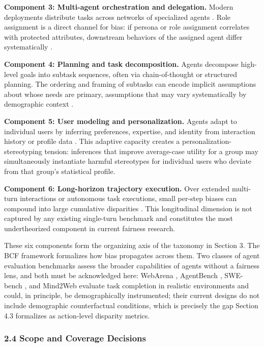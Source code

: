 \documentclass[10pt]{article}
\begin{document}
\textbf{Component 3: Multi-agent orchestration and delegation.} Modern deployments distribute tasks across networks of specialized agents \cite{wu2023autogen,park2023generative}. Role assignment is a direct channel for bias: if persona or role assignment correlates with protected attributes, downstream behaviors of the assigned agent differ systematically \cite{gupta2023bias,nguyen2025social}.

\textbf{Component 4: Planning and task decomposition.} Agents decompose high-level goals into subtask sequences, often via chain-of-thought or structured planning. The ordering and framing of subtasks can encode implicit assumptions about whose needs are primary, assumptions that may vary systematically by demographic context \cite{li2025actions,wu2025reasoning}.

\textbf{Component 5: User modeling and personalization.} Agents adapt to individual users by inferring preferences, expertise, and identity from interaction history or profile data \cite{kantharuban2024stereotype}. This adaptive capacity creates a personalization-stereotyping tension: inferences that improve average-case utility for a group may simultaneously instantiate harmful stereotypes for individual users who deviate from that group's statistical profile.

\textbf{Component 6: Long-horizon trajectory execution.} Over extended multi-turn interactions or autonomous task executions, small per-step biases can compound into large cumulative disparities \cite{ma2026implicit,wyllie2024fairness}. This longitudinal dimension is not captured by any existing single-turn benchmark and constitutes the most undertheorized component in current fairness research.

These six components form the organizing axis of the taxonomy in Section 3. The BCF framework formalizes how bias propagates across them. Two classes of agent evaluation benchmarks assess the broader capabilities of agents without a fairness lens, and both must be acknowledged here: WebArena \cite{zhou2024webarena}, AgentBench \cite{liu2024agentbench}, SWE-bench \cite{jimenez2024swe}, and Mind2Web \cite{deng2023mind2web} evaluate task completion in realistic environments and could, in principle, be demographically instrumented; their current designs do not include demographic counterfactual conditions, which is precisely the gap Section 4.3 formalizes as action-level disparity metrics.


\subsubsection*{2.4 Scope and Coverage Decisions}
\end{document}
